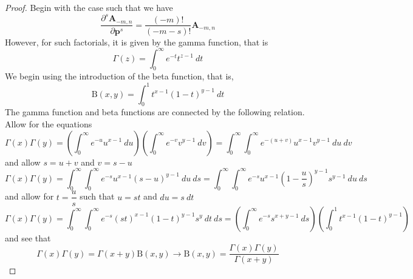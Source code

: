 \documentclass[a4paper]{article}
\theoremstyle{definition}
\begin{document}
\begin{proof}
	Begin with the case such that we have
	\begin{equation}
		\frac{\partial^s\textbf{A}_{-m,n}}{\partial\textbf{p}^s}=\frac{(-m)!}{(-m-s)!}\textbf{A}_{-m,n}
	\end{equation}
	However, for such factorials, it is given by the gamma function, that is
	\begin{equation}
		\Gamma(z)=\int_0^\infty e^{-t}t^{z-1}~dt
	\end{equation}
	We begin using the introduction of the beta function, that is,
	\begin{equation}
		\text{B}(x,y)=\int_0^1t^{x-1}(1-t)^{y-1}~dt
	\end{equation}
	The gamma function and beta functions are connected by the following relation. Allow for the equations
	\begin{equation}
		\Gamma(x)\Gamma(y)=\left(\int_0^\infty e^{-u}u^{x-1}~du\right) \left(\int_0^\infty e^{-v}v^{y-1}~dv\right)=\int_0^\infty\int_0^\infty e^{-(u+v)}u^{x-1}v^{y-1}~du~dv
	\end{equation}
	and allow $s=u+v$ and $v=s-u$
	\begin{equation}
		\Gamma(x)\Gamma(y)=\int_0^\infty\int_0^\infty e^{-s}u^{x-1}(s-u)^{y-1}~du~ds=\int_0^\infty\int_0^\infty e^{-s}u^{x-1}\left(1-\frac{u}{s}\right)^{y-1}s^{y-1}~du~ds
	\end{equation}
	and allow for $t=\dfrac{u}{s}$ such that $u=st$ and $du=s~dt$
	\begin{equation}
		\Gamma(x)\Gamma(y)=\int_0^\infty\int_0^\infty e^{-s}(st)^{x-1}\left(1-t\right)^{y-1}s^{y}~dt~ds=\left(\int_0^\infty e^{-s}s^{x+y-1}~ds\right)\left(\int_0^1t^{x-1}(1-t)^{y-1}\right) 
	\end{equation}
	and see that
	\begin{equation}
		\Gamma(x)\Gamma(y)=\Gamma(x+y)\text{B}(x,y)\longrightarrow\text{B}(x,y)=\frac{\Gamma(x)\Gamma(y)}{\Gamma(x+y)}
	\end{equation}
	

\end{proof}
\end{document}
